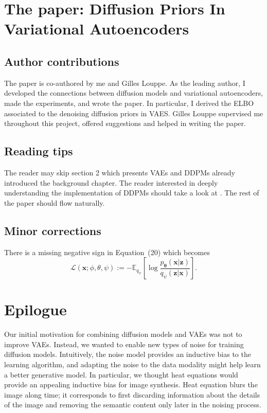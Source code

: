 \section{The paper: Diffusion Priors In Variational Autoencoders}

\subsection{Author contributions}
The paper is co-authored by me and Gilles Louppe. As the leading author, I developed the connections between diffusion models and variational autoencoders, made the experiments, and wrote the paper. In particular, I derived the ELBO associated to the denoising diffusion priors in VAES. Gilles Louppe supervised me throughout this project, offered suggestions and helped in writing the paper.

\subsection{Reading tips}
The reader may skip section 2 which presents VAEs and DDPMs already introduced the background chapter. The reader interested in deeply understanding the implementation of DDPMs should take a look at \citet{ho_denoising_2020}. The rest of the paper should flow naturally.

\subsection{Minor corrections}
There is a missing negative sign in Equation~(20) which becomes
$$\mathcal{L}(\mathbf{x}; \phi, \theta, \psi) := -\mathbb{E}_{q_{\psi}}\left[\log \frac{p_{\mathbf{\theta}}(\mathbf{x}|\mathbf{z})}{q_{\psi}(\mathbf{z}|\mathbf{x})} \right] .$$



\section{Epilogue}

Our initial motivation for combining diffusion models and VAEs was not to improve VAEs. Instead, we wanted to enable new types of noise for training diffusion models. Intuitively, the noise model provides an inductive bias to the learning algorithm, and adapting the noise to the data modality might help learn a better generative model. In particular, we thought heat equations would provide an appealing inductive bias for image synthesis. Heat equation blurs the image along time; it corresponds to first discarding information about the details of the image and removing the semantic content only later in the noising process.

